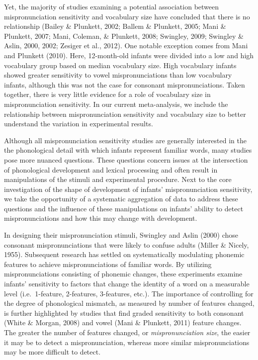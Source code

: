 \documentclass[man]{apa6}
\theoremstyle{definition}
\theoremstyle{definition}
\theoremstyle{definition}
\theoremstyle{remark}
\begin{document}
Yet, the majority of studies examining a potential association between
mispronunciation sensitivity and vocabulary size have concluded that
there is no relationship (Bailey \& Plunkett, 2002; Ballem \& Plunkett,
2005; Mani \& Plunkett, 2007; Mani, Coleman, \& Plunkett, 2008;
Swingley, 2009; Swingley \& Aslin, 2000, 2002; Zesiger et al., 2012).
One notable exception comes from Mani and Plunkett (2010). Here,
12-month-old infants were divided into a low and high vocabulary group
based on median vocabulary size. High vocabulary infants showed greater
sensitivity to vowel mispronunciations than low vocabulary infants,
although this was not the case for consonant mispronunciations. Taken
together, there is very little evidence for a role of vocabulary size in
mispronunciation sensitivity. In our current meta-analysis, we include
the relationship between mispronunciation sensitivity and vocabulary
size to better understand the variation in experimental results.

Although all mispronunciation sensitivity studies are generally
interested in the the phonological detail with which infants represent
familiar words, many studies pose more nuanced questions. These
questions concern issues at the intersection of phonological development
and lexical processing and often result in manipulations of the stimuli
and experimental procedure. Next to the core investigation of the shape
of development of infants' mispronunciation sensitivity, we take the
opportunity of a systematic aggregation of data to address these
questions and the influence of these manipulations on infants' ability
to detect mispronunciations and how this may change with development.

In designing their mispronunciation stimuli, Swingley and Aslin (2000)
chose consonant mispronunciations that were likely to confuse adults
(Miller \& Nicely, 1955). Subsequent research has settled on
systematically modulating phonemic features to achieve mispronunciations
of familiar words. By utilizing mispronunciations consisting of phonemic
changes, these experiments examine infants' sensitivity to factors that
change the identity of a word on a measurable level (i.e.~1-feature,
2-features, 3-features, etc.). The importance of controlling for the
degree of phonological mismatch, as measured by number of features
changed, is further highlighted by studies that find graded sensitivity
to both consonant (White \& Morgan, 2008) and vowel (Mani \& Plunkett,
2011) feature changes. The greater the number of features changed, or
\emph{mispronunciation size}, the easier it may be to detect a
mispronunciation, whereas more similar mispronunciations may be more
difficult to detect.
\end{document}
